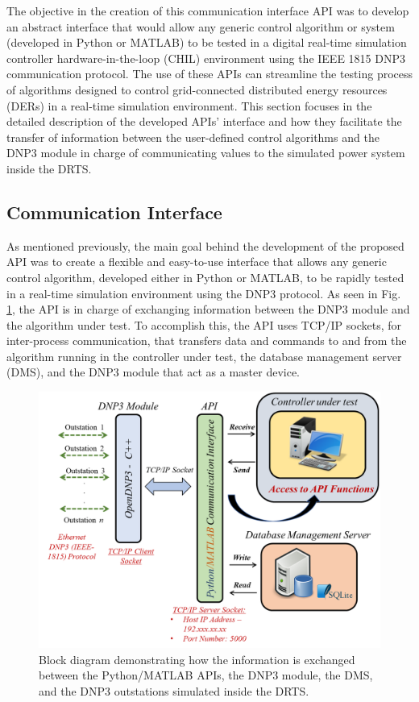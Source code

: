 The objective in the creation of this communication interface API was to develop an abstract interface that would allow any generic control algorithm or system (developed in Python or MATLAB) to be tested in a digital real-time simulation controller hardware-in-the-loop (CHIL) environment using the IEEE 1815 DNP3 communication protocol. The use of these APIs can streamline the testing process of algorithms designed to control grid-connected distributed energy resources (DERs) in a real-time simulation environment. This section focuses in the detailed description of the developed APIs' interface and how they facilitate the transfer of information between the user-defined control algorithms and the DNP3 module in charge of communicating values to the simulated power system inside the DRTS.

\subsection{Communication Interface}
As mentioned previously, the main goal behind the development of the proposed API was to create a flexible and easy-to-use interface that allows any generic control algorithm, developed either in Python or MATLAB, to be rapidly tested in a real-time simulation environment using the DNP3 protocol. As seen in Fig. \ref{fig:apiblocks}, the API is in charge of exchanging information between the DNP3 module and the algorithm under test. To accomplish this, the API uses TCP/IP sockets, for inter-process communication, that transfers data and commands to and from the algorithm running in the controller under test, the database management server (DMS), and the DNP3 module that act as a master device. 

\begin{figure}[!ht]
    \centering
    \includegraphics[width = 1.0\linewidth]{figs_juan/apiblocks.png}
    \caption{Block diagram demonstrating how the information is exchanged between the Python/MATLAB APIs, the DNP3 module, the DMS, and the DNP3 outstations simulated inside the DRTS.}
    \label{fig:apiblocks}
\end{figure}


